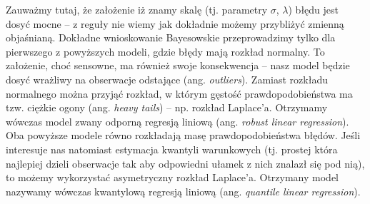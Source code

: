 \documentclass{myclass}
\begin{document}
Zauważmy tutaj, że założenie iż znamy skalę (tj. parametry \(\sigma\), \(\lambda\)) błędu jest dosyć
mocne -- z reguły nie wiemy jak dokładnie możemy przybliżyć zmienną objaśnianą. Dokładne
wnioskowanie Bayesowskie przeprowadzimy tylko dla pierwszego z powyższych modeli, gdzie błędy mają
rozkład normalny. To założenie, choć sensowne, ma również swoje konsekwencja -- nasz model będzie
dosyć wrażliwy na obserwacje odstające (ang. \emph{outliers}). Zamiast rozkładu normalnego można
przyjąć rozkład, w którym gęstość prawdopodobieństwa ma tzw. ciężkie ogony (ang. \emph{heavy tails})
-- np. rozkład Laplace'a. Otrzymamy wówczas model zwany odporną regresją liniową (ang. \emph{robust
linear regression}). Oba powyższe modele równo rozkładają masę prawdopodobieństwa błędów. Jeśli
interesuje nas natomiast estymacja kwantyli warunkowych (tj. prostej która najlepiej dzieli
obserwacje tak aby odpowiedni ułamek z nich znalazł się pod nią), to możemy wykorzystać asymetryczny
rozkład Laplace'a. Otrzymany model nazywamy wówczas kwantylową regresją liniową (ang. \emph{quantile
linear regression}).
\end{document}
